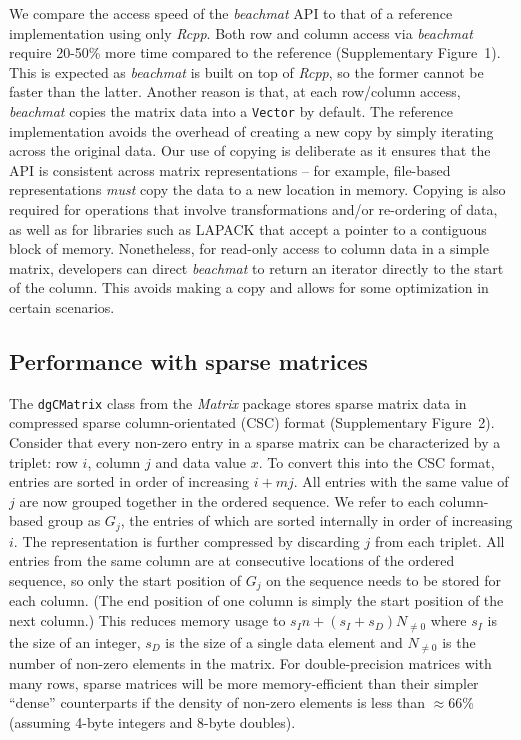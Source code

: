 \documentclass[10pt,letterpaper]{article}
\newcommand{\beachmat}{\textit{beachmat}}
\newcommand{\code}[1]{\texttt{#1}}
\newcommand{\suppfigsimpleaccess}{1}
\newcommand{\suppfigsparseschem}{2}
\begin{document}

We compare the access speed of the \beachmat{} API to that of a reference implementation using only \textit{Rcpp}.
Both row and column access via \beachmat{} require 20-50\% more time compared to the reference (Supplementary Figure~\suppfigsimpleaccess{}).
This is expected as \beachmat{} is built on top of \textit{Rcpp}, so the former cannot be faster than the latter.
Another reason is that, at each row/column access, \beachmat{} copies the matrix data into a \code{Vector} by default.
The reference implementation avoids the overhead of creating a new copy by simply iterating across the original data.
Our use of copying is deliberate as it ensures that the API is consistent across matrix representations -- for example, file-based representations \textit{must} copy the data to a new location in memory.
Copying is also required for operations that involve transformations and/or re-ordering of data, as well as for libraries such as LAPACK that accept a pointer to a contiguous block of memory.
Nonetheless, for read-only access to column data in a simple matrix, developers can direct \beachmat{} to return an iterator directly to the start of the column.
This avoids making a copy and allows for some optimization in certain scenarios.

\subsection*{Performance with sparse matrices}
The \code{dgCMatrix} class from the \textit{Matrix} package stores sparse matrix data in compressed sparse column-orientated (CSC) format (Supplementary Figure~\suppfigsparseschem{}).
Consider that every non-zero entry in a sparse matrix can be characterized by a triplet: row $i$, column $j$ and data value $x$.
To convert this into the CSC format, entries are sorted in order of increasing $i + mj$.
All entries with the same value of $j$ are now grouped together in the ordered sequence.
We refer to each column-based group as $G_j$, the entries of which are sorted internally in order of increasing $i$.
The representation is further compressed by discarding $j$ from each triplet.
All entries from the same column are at consecutive locations of the ordered sequence, so only the start position of $G_j$ on the sequence needs to be stored for each column.
(The end position of one column is simply the start position of the next column.)
This reduces memory usage to $s_In + (s_I + s_D) N_{\ne 0}$ where $s_I$ is the size of an integer, $s_D$ is the size of a single data element and $N_{\ne 0}$ is the number of non-zero elements in the matrix.
For double-precision matrices with many rows, sparse matrices will be more memory-efficient than their simpler ``dense'' counterparts if the density of non-zero elements is less than $\approx66$\% (assuming 4-byte integers and 8-byte doubles). 
\end{document}
